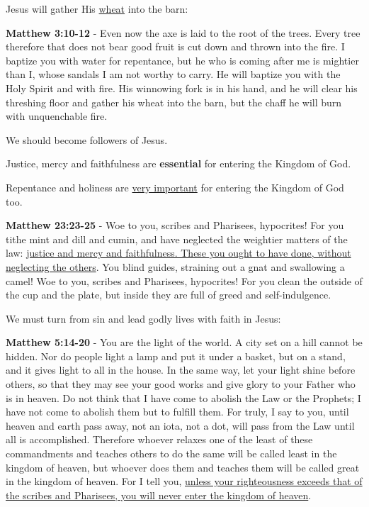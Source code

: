 \documentclass[11pt]{article}
\begin{document}
Jesus will gather His \uline{wheat} into the barn:

\textbf{Matthew 3:10-12} - Even now the axe is laid to the root of the trees. Every tree therefore that does not bear good fruit is cut down and thrown into the fire. I baptize you with water for repentance, but he who is coming after me is mightier than I, whose sandals I am not worthy to carry. He will baptize you with the Holy Spirit and with fire. His winnowing fork is in his hand, and he will clear his threshing floor and gather his wheat into the barn, but the chaff he will burn with unquenchable fire.

We should become followers of Jesus.

Justice, mercy and faithfulness are \textbf{essential} for entering the Kingdom of God.

Repentance and holiness are \uline{very important} for entering the Kingdom of God too.

\textbf{Matthew 23:23-25} - Woe to you, scribes and Pharisees, hypocrites! For you tithe mint and dill and cumin, and have neglected the weightier matters of the law: \uline{justice and mercy and faithfulness. These you ought to have done, without neglecting the others}. You blind guides, straining out a gnat and swallowing a camel! Woe to you, scribes and Pharisees, hypocrites! For you clean the outside of the cup and the plate, but inside they are full of greed and self-indulgence.

We must turn from sin and lead godly lives with faith in Jesus:

\textbf{Matthew 5:14-20} - You are the light of the world. A city set on a hill cannot be hidden. Nor do people light a lamp and put it under a basket, but on a stand, and it gives light to all in the house. In the same way, let your light shine before others, so that they may see your good works and give glory to your Father who is in heaven. Do not think that I have come to abolish the Law or the Prophets; I have not come to abolish them but to fulfill them. For truly, I say to you, until heaven and earth pass away, not an iota, not a dot, will pass from the Law until all is accomplished. Therefore whoever relaxes one of the least of these commandments and teaches others to do the same will be called least in the kingdom of heaven, but whoever does them and teaches them will be called great in the kingdom of heaven. For I tell you, \uline{unless your righteousness exceeds that of the scribes and Pharisees, you will never enter the kingdom of heaven}.
\end{document}
